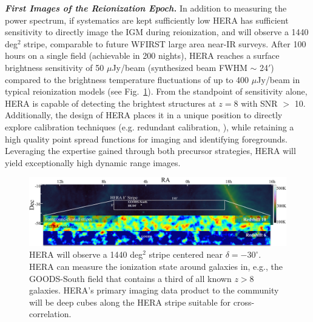 \documentclass[preprint,11pt]{aastex}
\begin{document}
\emph{\textbf{First Images of the Reionization Epoch.}}
\label{sec:imaging}
In addition to measuring the power spectrum, if systematics are kept sufficiently low HERA has sufficient 
sensitivity to directly image the IGM during reionization,
and will observe a 1440 deg$^2$ stripe, comparable to future WFIRST
large area near-IR surveys.
 After 100 hours on a
single field (achievable in 200 nights), HERA reaches a surface brightness 
sensitivity of 50 $\mu$Jy/beam (synthesized beam FWHM $\sim$ 24$'$) compared 
to the brightness temperature fluctuations of up to 400 $\mu$Jy/beam in typical 
reionization models (see Fig.~\ref{fig:LSS}). From the standpoint of sensitivity alone, HERA is capable of 
detecting the brightest structures at $z=8$ with SNR $>$ 10. Additionally, the design 
of HERA places it in a unique position to directly explore calibration techniques
(e.g. redundant calibration, \citealt{liu_et_al2010,zheng_et_al2014}), while retaining a high quality 
point spread functions for imaging and identifying foregrounds. Leveraging the expertise gained 
through both precursor strategies, HERA will yield exceptionally high dynamic range
images.


\begin{figure}[b!]
\centering
\vspace{-15pt}
    \includegraphics[width=1.0\textwidth,clip]{plots/HERA_FoV_w_strips.png}
  \vspace{-20pt}
\caption{\footnotesize 
HERA will observe a 1440 deg$^2$ stripe centered near $\delta = -30^\circ$. HERA can measure the ionization state around galaxies in, e.g., the GOODS-South field that contains a third of all known $z\!>\!8$ galaxies. HERA's primary imaging data product to the community will be deep cubes along the HERA stripe suitable for cross-correlation.
\label{fig:LSS} }
\vspace{-10pt}
\end{figure}
\end{document}
